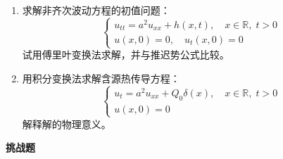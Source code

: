\begin{enumerate}[resume]
    \item 求解非齐次波动方程的初值问题：
    \begin{equation}
        \begin{cases}
            u_{tt} = a^2 u_{xx} + h(x,t), \quad x \in \mathbb{R}, \; t > 0 \\
            u(x, 0) = 0, \quad u_t(x, 0) = 0
        \end{cases}
    \end{equation}
    试用傅里叶变换法求解，并与推迟势公式比较。
    
    \item 用积分变换法求解含源热传导方程：
    \begin{equation}
        \begin{cases}
            u_t = a^2 u_{xx} + Q_0\delta(x), \quad x \in \mathbb{R}, \; t > 0 \\
            u(x, 0) = 0
        \end{cases}
    \end{equation}
    解释解的物理意义。
\end{enumerate}

\textbf{挑战题}

